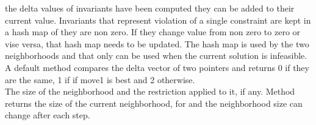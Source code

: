 the delta values of invariants have been computed they can be added to their current value. Invariants that represent 
violation of a single constraint are kept in a hash map of they are non zero. If they change value from non zero to zero 
or vise versa, that hash map needs to be updated. The hash map is used by the two neighborhoods  
and  that only can be used when the current solution is infeasible. \\
A default method  compares the delta vector of two  pointers and returns 
0 if they are the same, 1 if if move1 is best and 2 otherwise. \\ 
The size of the neighborhood and the restriction applied to it, if any. Method  returns the size of 
the current neighborhood, for  and  the neighborhood size can change 
after each step. \\ 




